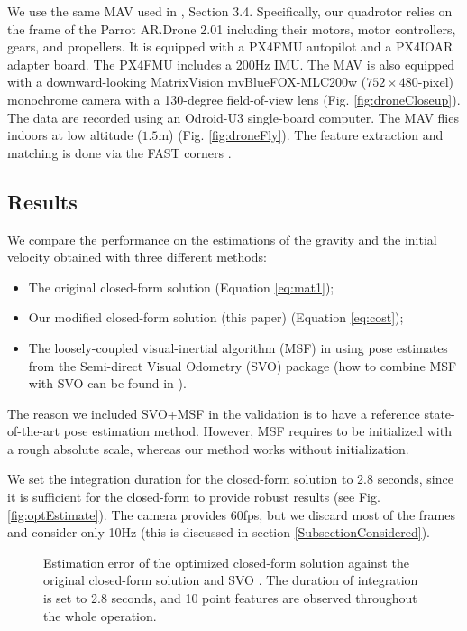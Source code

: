 \documentclass[letterpaper, 10 pt, journal, final]{ieeeconf}  %
\begin{document}
We use the same MAV used in \cite{FaesslerICRA15}, Section 3.4.
Specifically, our quadrotor relies on the frame of the Parrot AR.Drone 2.01 including their motors, motor controllers, gears, and propellers.
It is equipped with a PX4FMU autopilot and a PX4IOAR adapter board.
The PX4FMU includes a 200Hz IMU.
The MAV is also equipped with a downward-looking MatrixVision mvBlueFOX-MLC200w ($752 \times 480$-pixel) monochrome camera with a 130-degree field-of-view lens (Fig. \ref{fig:droneCloseup}).
The data are recorded using an Odroid-U3 single-board computer.
The MAV flies indoors at low altitude ($1.5$m) (Fig. \ref{fig:droneFly}).
The feature extraction and matching is done via the FAST corners \cite{Rosten2006}.

\subsection{Results}

We compare the performance on the estimations of the gravity and the initial velocity obtained with three different methods:
\begin{itemize}
\item The original closed-form solution \cite{Martinelli2014} (Equation \ref{eq:mat1});
\item Our modified closed-form solution (this paper) (Equation \ref{eq:cost});
\item The loosely-coupled visual-inertial algorithm (MSF) in \cite{LynenIROS13} using pose estimates from the Semi-direct Visual Odometry (SVO) package \cite{Forster2014} (how to combine MSF \cite{LynenIROS13} with SVO can be found in \cite{FaesslerICRA15}).
\end{itemize}
The reason we included SVO+MSF in the validation is to have a reference state-of-the-art pose estimation method.
However, MSF requires to be initialized with a rough absolute scale, whereas our method works without initialization.

We set the integration duration for the closed-form solution to 2.8 seconds, since it is sufficient for the closed-form to provide robust results (see Fig. \ref{fig:optEstimate}).
The camera provides 60fps, but we discard most of the frames and consider only 10Hz (this is discussed in section \ref{SubsectionConsidered}).

\begin{figure}
   \centering
   \resizebox{0.7\columnwidth}{!}{}
   \caption{Estimation error of the optimized closed-form solution against the original closed-form solution \cite{Martinelli2014} and SVO \cite{FaesslerICRA15}. The duration of integration is set to 2.8 seconds, and 10 point features are observed throughout the whole operation.\label{fig:valid}}
\end{figure}
\end{document}
